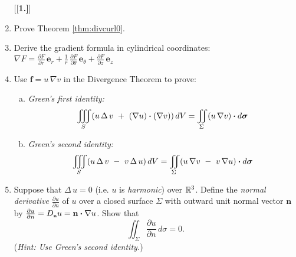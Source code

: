 \begin{enumerate}[\bfseries 1.]
[{[\bfseries 1.]}]
 \item Prove Theorem \ref{thm:divcurl0}.
 \item Derive the gradient formula in cylindrical coordinates: $\nabla F =
  \frac{\partial F}{\partial r}\,\mathbf{e}_{r} +
  \frac{1}{r}\,\frac{\partial F}{\partial \theta}\,\mathbf{e}_{\theta}+\frac{\partial F}{\partial z}\,\mathbf{e}_{z}$
 \item Use $\mathbf{f} = u\,\nabla v$ in the Divergence Theorem to prove:
  \begin{enumerate}[(a)]
   \item \emph{Green's first identity:}
    \[\iiint_{S} (u\,\Delta\,v ~+~ (\nabla u) \bm{\cdot} (\nabla v))\,dV =
    \iint_{\Sigma} (u\,\nabla v) \bm{\cdot} d\bm{\sigma}\]
   \item \emph{Green's second identity:}
    \[\iiint_{S} (u\,\Delta\,v ~-~ v\,\Delta\,u)\,dV =
    \iint_{\Sigma} (u\,\nabla v ~-~ v\,\nabla u) \bm{\cdot} d\bm{\sigma}\]
  \end{enumerate}
 \item Suppose that $\Delta\,u = 0$ (i.e. $u$ is \emph{harmonic}) over $\mathbb{R}^{3}$. Define the
  \emph{normal derivative} $\frac{\partial u}{\partial n}$ of $u$ over a closed surface
  $\Sigma$ with outward unit normal vector $\mathbf{n}$ by $\frac{\partial u}{\partial n} = D_{\scriptscriptstyle \mathbf{n}}u =
  \mathbf{n} \bm{\cdot} \nabla u$. 
  Show that 
  \[\iint_{\Sigma} \frac{\partial u}{\partial n} \,d\sigma = 0.\]
  (\emph{Hint: Use Green's second identity.})
\end{enumerate}
